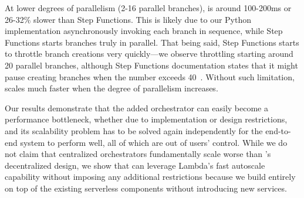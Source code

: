 At lower degrees of parallelism (2-16 parallel branches), \name{} is around
100-200ms or 26-32\% slower than Step Functions. This is likely due to our
Python implementation asynchronously invoking each branch in sequence, while
Step Functions starts branches truly in parallel. That being said, Step
Functions starts to throttle branch creations very quickly---we observe
throttling starting around 20 parallel branches, although Step Functions
documentation states that it might pause creating branches when the number
exceeds 40~\cite{aws-step-functions-map-state}. Without such limitation,
\name{} scales much faster when the degree of parallelism increases.

Our results demonstrate that the added orchestrator can easily become a
performance bottleneck, whether due to implementation or design restrictions,
and its scalability problem has to be solved again independently for the
end-to-end system to perform well, all of which are out of users' control.
While we do not claim that centralized orchestrators fundamentally scale worse
than \name{}'s decentralized design, we show that \name{} can leverage
Lambda's fast autoscale capability without imposing any additional
restrictions because we build entirely on top of the existing serverless
components without introducing new services.






